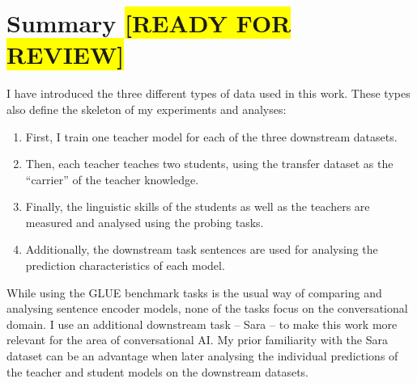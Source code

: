 \documentclass[bsc,frontabs,twoside,singlespacing,parskip,deptreport]{infthesis}
\def\reviewready{\colorbox{yellow}{[READY FOR REVIEW]}}
\begin{document}
{  \section{Summary \reviewready}{
    I have introduced the three different types of data used in this work. These types also define the skeleton of my experiments and analyses:
    \begin{enumerate}
      \item First, I train one teacher model for each of the three downstream datasets.
      \item Then, each teacher teaches two students, using the transfer dataset as the ``carrier'' of the teacher knowledge.
      \item Finally, the linguistic skills of the students as well as the teachers are measured and analysed using the probing tasks.
      \item Additionally, the downstream task sentences are used for analysing the prediction characteristics of each model.
    \end{enumerate}
    While using the GLUE benchmark tasks is the usual way of comparing and analysing sentence encoder models, none of the tasks focus on the conversational domain. I use an additional downstream task -- Sara -- to make this work more relevant for the area of conversational AI.
    My prior familiarity with the Sara dataset can be an advantage when later analysing the individual predictions of the teacher and student models on the downstream datasets.
  }
}
\end{document}
